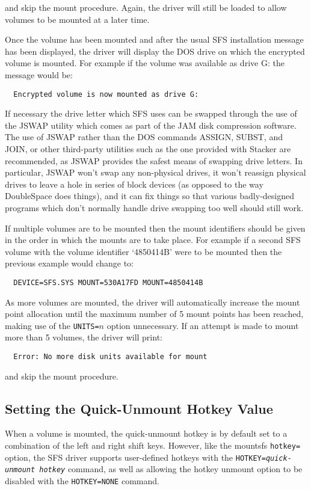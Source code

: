 and skip the mount procedure.  Again, the driver will still be loaded to allow 
volumes to be mounted at a later time.

Once the volume has been mounted and after the usual SFS installation message
has been displayed, the driver will display the DOS drive on which the
encrypted volume is mounted.  For example if the volume was available as drive
G: the message would be:

{\tt \verb|  |Encrypted volume is now mounted as drive G:}

If necessary the drive letter which SFS uses can be swapped through the use of
the JSWAP utility which comes as part of the JAM disk compression software.
The use of JSWAP rather than the DOS commands ASSIGN, SUBST, and JOIN, or other
third-party utilities such as the one provided with Stacker are recommended, as
JSWAP provides the safest means of swapping drive letters.  In particular,
JSWAP won't swap any non-physical drives, it won't reassign physical drives to
leave a hole in series of block devices (as opposed to the way DoubleSpace does
things), and it can fix things so that various badly-designed programs which
don't normally handle drive swapping too well should still work.
 
If multiple volumes are to be mounted then the mount identifiers should be
given in the order in which the mounts are to take place.  For example if a
second SFS volume with the volume identifier `4850414B' were to be mounted then 
the previous example would change to:

{\tt \verb|  |DEVICE=SFS.SYS MOUNT=530A17FD MOUNT=4850414B}

As more volumes are mounted, the driver will automatically increase the mount
point allocation until the maximum number of 5 mount points has been reached,
making use of the {\tt UNITS=$n$} option unnecessary.  If an attempt is made to 
mount more than 5 volumes, the driver will print:

{\tt \verb|  |Error: No more disk units available for mount}

and skip the mount procedure.


\subsection{Setting the Quick-Unmount Hotkey Value}

When a volume is mounted, the quick-unmount hotkey is by default set to a
combination of the left and right shift keys.  However, like the mountsfs
{\tt hotkey=} option, the SFS driver supports user-defined hotkeys with the
{\tt HOTKEY={\em quick-unmount hotkey}} command, as well as allowing the hotkey unmount
option to be disabled with the {\tt HOTKEY=NONE} command.

